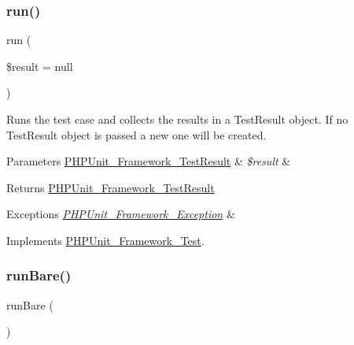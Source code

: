\subsubsection{\texorpdfstring{run()}{run()}}
{\footnotesize\ttfamily run (\begin{DoxyParamCaption}\item[{\mbox{\hyperlink{class_p_h_p_unit___framework___test_result}{P\+H\+P\+Unit\+\_\+\+Framework\+\_\+\+Test\+Result}}}]{\$result = {\ttfamily null} }\end{DoxyParamCaption})}

Runs the test case and collects the results in a Test\+Result object. If no Test\+Result object is passed a new one will be created.


\begin{DoxyParams}[1]{Parameters}
\mbox{\hyperlink{class_p_h_p_unit___framework___test_result}{P\+H\+P\+Unit\+\_\+\+Framework\+\_\+\+Test\+Result}} & {\em \$result} & \\
\hline
\end{DoxyParams}
\begin{DoxyReturn}{Returns}
\mbox{\hyperlink{class_p_h_p_unit___framework___test_result}{P\+H\+P\+Unit\+\_\+\+Framework\+\_\+\+Test\+Result}}
\end{DoxyReturn}

\begin{DoxyExceptions}{Exceptions}
{\em \mbox{\hyperlink{class_p_h_p_unit___framework___exception}{P\+H\+P\+Unit\+\_\+\+Framework\+\_\+\+Exception}}} & \\
\hline
\end{DoxyExceptions}


Implements \mbox{\hyperlink{interface_p_h_p_unit___framework___test_aba2e5a83092b40735a7a61c572cd6256}{P\+H\+P\+Unit\+\_\+\+Framework\+\_\+\+Test}}.

\mbox{\label{class_p_h_p_unit___framework___test_case_a3473c953293b878519f7e2441c6ae4ef}} 
\subsubsection{\texorpdfstring{run\+Bare()}{runBare()}}
{\footnotesize\ttfamily run\+Bare (\begin{DoxyParamCaption}{ }\end{DoxyParamCaption})}

